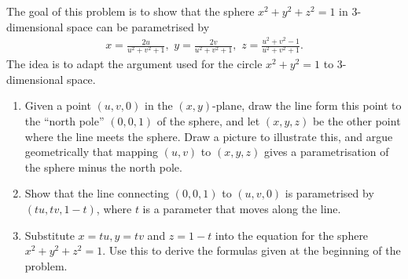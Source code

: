 \begin{exercise}{6}
The goal of this problem is to show that the sphere $x^2+y^2+z^2=1$ in 3-dimensional space can be parametrised by
\begin{align*}
    x=\frac{2u}{u^2+v^2+1},\,\, y=\frac{2v}{u^2+v^2+1},\,\, z=\frac{u^2+v^2-1}{u^2+v^2+1}.
\end{align*}
The idea is to adapt the argument used for the circle $x^2+y^2=1$ to 3-dimensional space.
\begin{enumerate}
    \item Given a point $(u,v,0)$ in the $(x,y)$-plane, draw the line form this point to the ``north pole'' $(0,0,1)$ of the sphere, and let $(x,y,z)$ be the other point where the line meets the sphere. Draw a picture to illustrate this, and argue geometrically that mapping $(u,v)$ to $(x,y,z)$ gives a parametrisation of the sphere minus the north pole.
    \item Show that the line connecting $(0,0,1)$ to $(u,v,0)$ is parametrised by $(tu,tv,1-t)$, where $t$ is a parameter that moves along the line.
    \item Substitute $x=tu, y=tv$ and $z=1-t$ into the equation for the sphere $x^2+y^2+z^2=1$. Use this to derive the formulas given at the beginning of the problem.
\end{enumerate}
\end{exercise}
